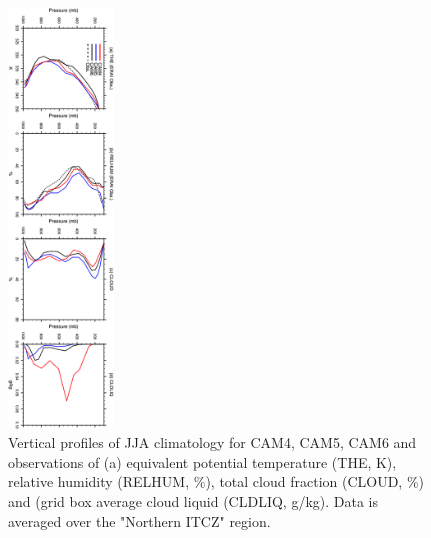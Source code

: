 \clearpage
\begin{figure}[t]
  \begin{center}
    \includegraphics[width=0.25\textwidth,angle=90.]{./figs/f_vprof_nitcz_JJA.pdf}
  \end{center}
  \caption{Vertical profiles of JJA climatology for CAM4, CAM5, CAM6 and observations of (a) equivalent potential temperature (THE, K), relative humidity (RELHUM, \%), total cloud fraction (CLOUD, \%) and (grid box average cloud liquid (CLDLIQ, g/kg). Data is averaged over the "Northern ITCZ" region.} 
\label{f_vprof_nitcz_JJA}
\end{figure} 

